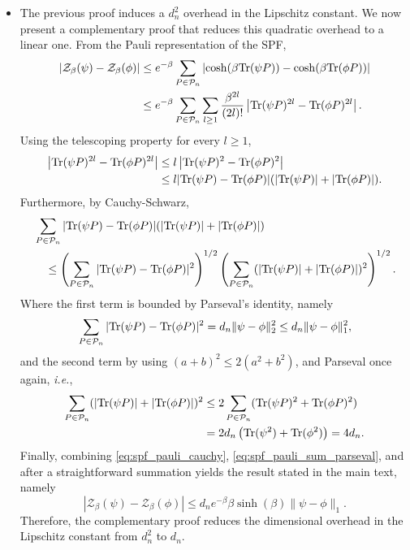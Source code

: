 \documentclass[aps,pra,superscriptaddress,twocolumn,longbibliography]{revtex4-2}
\newcommand{\tr}{{\rm Tr}}
\begin{document}
\begin{itemize}
\item  The previous proof induces a \(d_n^2\) overhead in the Lipschitz constant. We now present a complementary proof that reduces this quadratic
overhead to a linear one. From the Pauli
representation of the SPF,
%
\begin{align}
    |\mathcal{Z}_{\beta}(\psi)-\mathcal{Z}_{\beta}(\phi)|
    &\leq e^{-\beta}\sum_{P\in\mathcal{P}_n}
    \left|\cosh(\beta \tr(\psi P))-\cosh(\beta \tr(\phi P))\right|
    \nonumber\\
    &\leq e^{-\beta}\sum_{P\in\mathcal{P}_n}
    \sum_{l\geq 1}\frac{\beta^{2l}}{(2l)!}
    \left|\tr(\psi P)^{2l}-\tr(\phi P)^{2l}\right|.
    \label{eq:spf_lipschitz_pauli_expansion}
\end{align}
%
Using the telescoping property for every \(l\geq 1\),
\begin{align}
    \left|\tr(\psi P)^{2l}-\tr(\phi P)^{2l}\right|
    &\leq l\left|\tr(\psi P)^2-\tr(\phi P)^2\right|
    \nonumber\\
    &\leq l|\tr(\psi P)-\tr(\phi P)|(|\tr(\psi P)|+|\tr(\phi P)|).
    \label{eq:spf_even_power_difference}
\end{align}
%
Furthermore, by Cauchy-Schwarz,
%
\begin{align}
    &\sum_{P\in\mathcal{P}_n}
    |\tr(\psi P)-\tr(\phi P)|(|\tr(\psi P)|+|\tr(\phi P)|)
    \nonumber\\
    &\quad\leq
    \left(\sum_{P\in\mathcal{P}_n}|\tr(\psi P)-\tr(\phi P)|^2\right)^{1/2}
    \left(\sum_{P\in\mathcal{P}_n}(|\tr(\psi P)|+|\tr(\phi P)|)^2\right)^{1/2}.
    \label{eq:spf_pauli_cauchy}
\end{align}
%
Where the first term is bounded by Parseval's identity, namely
%
\begin{equation}
    \sum_{P\in\mathcal{P}_n}|\tr(\psi P)-\tr(\phi P)|^2
    =
    d_n\|\psi-\phi\|_2^2
    \leq
    d_n\|\psi-\phi\|_1^2,
    \label{eq:spf_pauli_difference_parseval}
\end{equation}
%
and the second term by using $(a+b)^2\leq2(a^2+b^2)$, and Parseval once again, \emph{i.e.},
%
\begin{align}
    \sum_{P\in\mathcal{P}_n}(|\tr(\psi P)|+|\tr(\phi P)|)^2
    &\leq
    2\sum_{P\in\mathcal{P}_n}(\tr(\psi P)^2+\tr(\phi P)^2)
    \nonumber\\
    &=
    2d_n\left(\tr(\psi^2)+\tr(\phi^2)\right)
    =
    4d_n.
    \label{eq:spf_pauli_sum_parseval}
\end{align}
%
Finally, combining \eqref{eq:spf_pauli_cauchy}, \eqref{eq:spf_pauli_sum_parseval}, and after a straightforward summation yields the result stated in the main text, namely
%
\begin{equation}
    |\mathcal{Z}_{\beta}(\psi)-\mathcal{Z}_{\beta}(\phi)|
    \leq
    d_ne^{-\beta}\beta\sinh(\beta)\|\psi-\phi\|_1.
\end{equation}
%
Therefore, the complementary proof reduces the dimensional overhead in the Lipschitz constant from $d_{n}^2$ to $d_{n}$.




\end{itemize}
\end{document}
